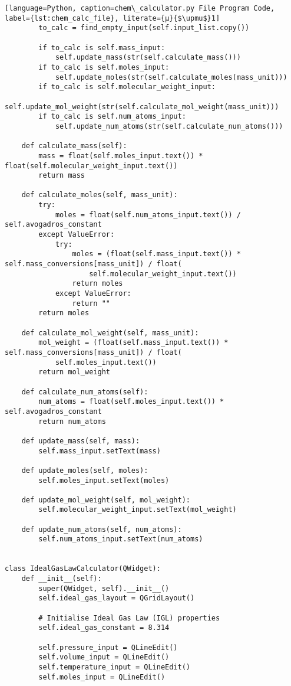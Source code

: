 \begin{lstlisting}[language=Python, caption=chem\_calculator.py File Program Code, label={lst:chem_calc_file}, literate={μ}{$\upmu$}1]
        to_calc = find_empty_input(self.input_list.copy())

        if to_calc is self.mass_input:
            self.update_mass(str(self.calculate_mass()))
        if to_calc is self.moles_input:
            self.update_moles(str(self.calculate_moles(mass_unit)))
        if to_calc is self.molecular_weight_input:
            self.update_mol_weight(str(self.calculate_mol_weight(mass_unit)))
        if to_calc is self.num_atoms_input:
            self.update_num_atoms(str(self.calculate_num_atoms()))

    def calculate_mass(self):
        mass = float(self.moles_input.text()) * float(self.molecular_weight_input.text())
        return mass

    def calculate_moles(self, mass_unit):
        try:
            moles = float(self.num_atoms_input.text()) / self.avogadros_constant
        except ValueError:
            try:
                moles = (float(self.mass_input.text()) * self.mass_conversions[mass_unit]) / float(
                    self.molecular_weight_input.text())
                return moles
            except ValueError:
                return ""
        return moles

    def calculate_mol_weight(self, mass_unit):
        mol_weight = (float(self.mass_input.text()) * self.mass_conversions[mass_unit]) / float(
            self.moles_input.text())
        return mol_weight

    def calculate_num_atoms(self):
        num_atoms = float(self.moles_input.text()) * self.avogadros_constant
        return num_atoms

    def update_mass(self, mass):
        self.mass_input.setText(mass)

    def update_moles(self, moles):
        self.moles_input.setText(moles)

    def update_mol_weight(self, mol_weight):
        self.molecular_weight_input.setText(mol_weight)

    def update_num_atoms(self, num_atoms):
        self.num_atoms_input.setText(num_atoms)


class IdealGasLawCalculator(QWidget):
    def __init__(self):
        super(QWidget, self).__init__()
        self.ideal_gas_layout = QGridLayout()

        # Initialise Ideal Gas Law (IGL) properties
        self.ideal_gas_constant = 8.314

        self.pressure_input = QLineEdit()
        self.volume_input = QLineEdit()
        self.temperature_input = QLineEdit()
        self.moles_input = QLineEdit()


\end{lstlisting}
